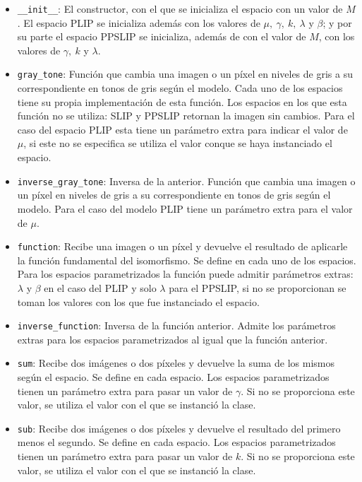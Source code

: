 \begin{itemize}
	\item \verb|__init__|: El constructor, con el que se inicializa el espacio con un valor de $M$. El espacio PLIP se inicializa adem\'as con los valores de $\mu,~\gamma,~k,~\lambda$ y $\beta$; y por su parte el espacio PPSLIP se inicializa, adem\'as de con el valor de $M$, con los valores de $\gamma,~k$ y $\lambda$.
	\item \verb|gray_tone|: Funci\'on que cambia una imagen o un p\'ixel en niveles de gris a su correspondiente en tonos de gris seg\'un el modelo. Cada uno de los espacios tiene su propia implementaci\'on de esta funci\'on. Los espacios en los que esta funci\'on no se utiliza: SLIP y PPSLIP retornan la imagen sin cambios. Para el caso del espacio PLIP esta tiene un par\'ametro extra para indicar el valor de $\mu$, si este no se especifica se utiliza el valor conque se haya instanciado el espacio.
	\item \verb|inverse_gray_tone|: Inversa de la anterior. Funci\'on que cambia una imagen o un p\'ixel en niveles de gris a su correspondiente en tonos de gris seg\'un el modelo. Para el caso del modelo PLIP tiene un par\'ametro extra para el valor de $\mu$.
	\item \verb|function|: Recibe una imagen o un p\'ixel y devuelve el resultado de aplicarle la funci\'on fundamental del isomorfismo. Se define en cada uno de los espacios. Para los espacios parametrizados la funci\'on puede admitir par\'ametros extras: $\lambda$ y $\beta$ en el caso del PLIP y solo $\lambda$ para el PPSLIP, si no se proporcionan se toman los valores con los que fue instanciado el espacio.
	\item \verb|inverse_function|: Inversa de la funci\'on anterior. Admite los par\'ametros extras para los espacios parametrizados al igual que la funci\'on anterior.
	\item \verb|sum|: Recibe dos im\'agenes o dos p\'ixeles y devuelve la suma de los mismos seg\'un el espacio. Se define en cada espacio. Los espacios parametrizados tienen un par\'ametro extra para pasar un valor de $\gamma$. Si no se proporciona este valor, se utiliza el valor con el que se instanci\'o la clase.
	\item  \verb|sub|: Recibe dos im\'agenes o dos p\'ixeles y devuelve el resultado del primero menos el segundo. Se define en cada espacio. Los espacios parametrizados tienen un par\'ametro extra para pasar un valor de $k$. Si no se proporciona este valor, se utiliza el valor con el que se instanci\'o la clase.

\end{itemize}
